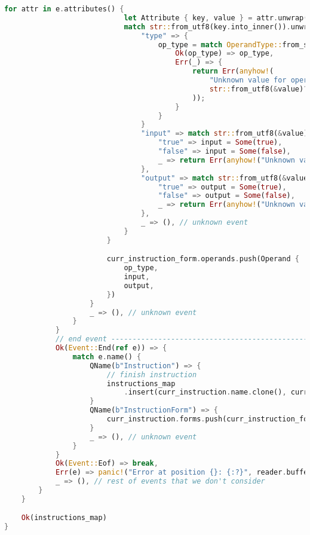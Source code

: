 \begin{lstlisting}[language=rust]
                        for attr in e.attributes() {
                            let Attribute { key, value } = attr.unwrap();
                            match str::from_utf8(key.into_inner()).unwrap() {
                                "type" => {
                                    op_type = match OperandType::from_str(str::from_utf8(&value)?) {
                                        Ok(op_type) => op_type,
                                        Err(_) => {
                                            return Err(anyhow!(
                                                "Unknown value for operand type -- Variant: {}",
                                                str::from_utf8(&value)?
                                            ));
                                        }
                                    }
                                }
                                "input" => match str::from_utf8(&value).unwrap() {
                                    "true" => input = Some(true),
                                    "false" => input = Some(false),
                                    _ => return Err(anyhow!("Unknown value for operand type")),
                                },
                                "output" => match str::from_utf8(&value).unwrap() {
                                    "true" => output = Some(true),
                                    "false" => output = Some(false),
                                    _ => return Err(anyhow!("Unknown value for operand type")),
                                },
                                _ => (), // unknown event
                            }
                        }

                        curr_instruction_form.operands.push(Operand {
                            op_type,
                            input,
                            output,
                        })
                    }
                    _ => (), // unknown event
                }
            }
            // end event --------------------------------------------------------------------------
            Ok(Event::End(ref e)) => {
                match e.name() {
                    QName(b"Instruction") => {
                        // finish instruction
                        instructions_map
                            .insert(curr_instruction.name.clone(), curr_instruction.clone());
                    }
                    QName(b"InstructionForm") => {
                        curr_instruction.forms.push(curr_instruction_form.clone());
                    }
                    _ => (), // unknown event
                }
            }
            Ok(Event::Eof) => break,
            Err(e) => panic!("Error at position {}: {:?}", reader.buffer_position(), e),
            _ => (), // rest of events that we don't consider
        }
    }

    Ok(instructions_map)
}
\end{lstlisting}

